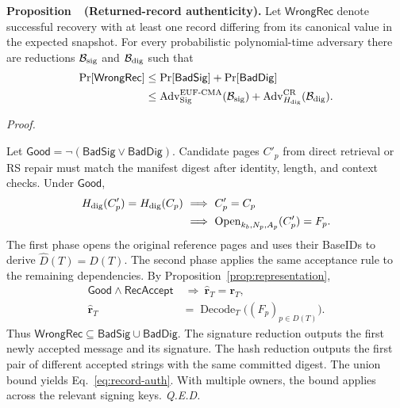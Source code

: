 \documentclass[10pt,journal]{IEEEtran}
\newcounter{proposition}
\newenvironment{proposition}[1]{%
  \refstepcounter{proposition}\par\smallskip\noindent
  \textbf{Proposition~\theproposition\ (#1). }\ignorespaces
}{\par\smallskip}
\newenvironment{claimproof}{\par\noindent\emph{Proof. }\ignorespaces
}{\hfill\textit{Q.E.D.}\par\smallskip}
\begin{document}
\begin{proposition}{Returned-record authenticity}\label{prop:record-auth}
Let $\mathsf{WrongRec}$ denote successful recovery with at least one record differing from its canonical value in the expected snapshot. For every probabilistic polynomial-time adversary there are reductions $\mathcal B_{\rm sig}$ and $\mathcal B_{\rm dig}$ such that
\begin{equation}\label{eq:record-auth}
\begin{aligned}
\Pr[\mathsf{WrongRec}]
&\leq \Pr[\mathsf{BadSig}]+\Pr[\mathsf{BadDig}]\\
&\leq \operatorname{Adv}^{\rm EUF\text{-}CMA}_{\rm Sig}(\mathcal B_{\rm sig})
+\operatorname{Adv}^{\rm CR}_{H_{\rm dig}}(\mathcal B_{\rm dig}).
\end{aligned}
\end{equation}
\end{proposition}
\begin{claimproof}
Let $\mathsf{Good}=\neg(\mathsf{BadSig}\lor\mathsf{BadDig})$. Candidate pages $C'_p$ from direct retrieval or RS repair must match the manifest digest after identity, length, and context checks. Under $\mathsf{Good}$,
\begin{equation}
\begin{aligned}
H_{\rm dig}(C'_p)=H_{\rm dig}(C_p)&\ \Longrightarrow\ C'_p=C_p\\
&\ \Longrightarrow\ \operatorname{Open}_{k_b,N_p,A_p}(C'_p)=F_p.
\end{aligned}
\end{equation}
The first phase opens the original reference pages and uses their BaseIDs to derive $\widehat D(T)=D(T)$. The second phase applies the same acceptance rule to the remaining dependencies. By Proposition~\ref{prop:representation},
\begin{equation}
\begin{aligned}
\mathsf{Good}\land\mathsf{RecAccept}&\ \Longrightarrow\ \widehat{\mathbf r}_T=\mathbf r_T,\\
\widehat{\mathbf r}_T&=\operatorname{Decode}_T\bigl((F_p)_{p\in D(T)}\bigr).
\end{aligned}
\end{equation}
Thus $\mathsf{WrongRec}\subseteq\mathsf{BadSig}\cup\mathsf{BadDig}$. The signature reduction outputs the first newly accepted message and its signature. The hash reduction outputs the first pair of different accepted strings with the same committed digest. The union bound yields Eq.~\eqref{eq:record-auth}. With multiple owners, the bound applies across the relevant signing keys.
\end{claimproof}
\end{document}
